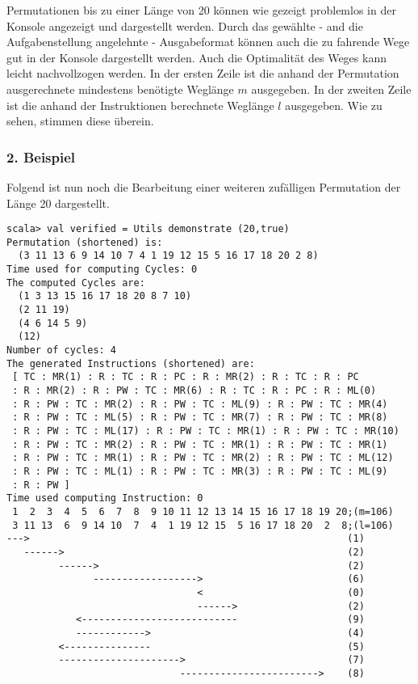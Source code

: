 Permutationen bis zu einer Länge von 20 können wie gezeigt problemlos in der Konsole angezeigt und dargestellt werden.
Durch das gewählte - and die Aufgabenstellung angelehnte - Ausgabeformat können auch die zu fahrende Wege gut in der Konsole dargestellt werden.
Auch die Optimalität des Weges kann leicht nachvollzogen werden.
In der ersten Zeile ist die anhand der Permutation ausgerechnete mindestens benötigte Weglänge $m$ ausgegeben.
In der zweiten Zeile ist die anhand der Instruktionen berechnete Weglänge $l$ ausgegeben. Wie zu sehen, stimmen diese überein.
\subsubsection*{2. Beispiel}
Folgend ist nun noch die Bearbeitung einer weiteren zufälligen Permutation der Länge 20 dargestellt.
\begin{lstlisting}
scala> val verified = Utils demonstrate (20,true)
Permutation (shortened) is:
  (3 11 13 6 9 14 10 7 4 1 19 12 15 5 16 17 18 20 2 8)
Time used for computing Cycles: 0
The computed Cycles are: 
  (1 3 13 15 16 17 18 20 8 7 10)
  (2 11 19)
  (4 6 14 5 9)
  (12)
Number of cycles: 4
The generated Instructions (shortened) are: 
 [ TC : MR(1) : R : TC : R : PC : R : MR(2) : R : TC : R : PC
 : R : MR(2) : R : PW : TC : MR(6) : R : TC : R : PC : R : ML(0)
 : R : PW : TC : MR(2) : R : PW : TC : ML(9) : R : PW : TC : MR(4)
 : R : PW : TC : ML(5) : R : PW : TC : MR(7) : R : PW : TC : MR(8)
 : R : PW : TC : ML(17) : R : PW : TC : MR(1) : R : PW : TC : MR(10)
 : R : PW : TC : MR(2) : R : PW : TC : MR(1) : R : PW : TC : MR(1)
 : R : PW : TC : MR(1) : R : PW : TC : MR(2) : R : PW : TC : ML(12)
 : R : PW : TC : ML(1) : R : PW : TC : MR(3) : R : PW : TC : ML(9)
 : R : PW ] 
Time used computing Instruction: 0
 1  2  3  4  5  6  7  8  9 10 11 12 13 14 15 16 17 18 19 20;(m=106)
 3 11 13  6  9 14 10  7  4  1 19 12 15  5 16 17 18 20  2  8;(l=106)
--->                                                       (1)
   ------>                                                 (2)
         ------>                                           (2)
               ------------------>                         (6)
                                 <                         (0)
                                 ------>                   (2)
            <---------------------------                   (9)
            ------------>                                  (4)
         <---------------                                  (5)
         --------------------->                            (7)
                              ------------------------>    (8)

\end{lstlisting}
